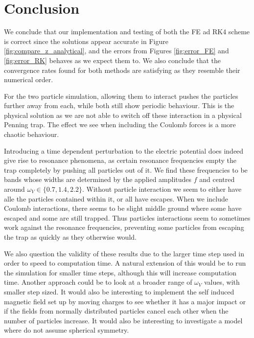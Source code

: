 \section{Conclusion}\label{sec:conclusion}

We conclude that our implementation and testing of both the FE ad RK4 scheme is correct since the solutions appear accurate in Figure \ref{fig:compare_z_analytical}, and the errors from Figures \ref{fig:error_FE} and \ref{fig:error_RK} behaves as we expect them to. We also conclude that the convergence rates found for both methods are satisfying as they resemble their numerical order. 


For the two particle simulation, allowing them to interact pushes the particles further away from each, while both still show periodic behaviour. This is the physical solution as we are not able to switch off these interaction in a physical Penning trap. The effect we see when including the Coulomb forces is a more chaotic behaviour. 

Introducing a time dependent perturbation to the electric potential does indeed give rise to resonance phenomena, as certain resonance frequencies empty the trap completely by pushing all particles out of it. We find these frequencies to be bands whose widths are determined by the applied amplitudes $f$ and centred around $\omega_V\in\{0.7, 1.4, 2.2\}$. Without particle interaction we seem to either have alle the particles contained within it, or all have escapes. When we include Coulomb interactions, there seems to be slight middle ground where some have escaped and some are still trapped. Thus particles interactions seem to sometimes work against the resonance frequencies, preventing some particles from escaping the trap as quickly as they otherwise would. 

We also question the validity of these results due to the larger time step used in order to speed to computation time. A natural extension of this would be to run the simulation for smaller time steps, although this will increase computation time. Another approach could be to look at a broader range of $\omega_V$ values, with smaller step sized. It would also be interesting to implement the self induced magnetic field set up by moving charges to see whether it has a major impact or if the fields from normally distributed particles cancel each other when the number of particles increase. It would also be interesting to investigate a model where do not assume spherical symmetry. 


